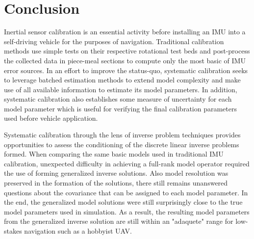 
\begingroup
\allowdisplaybreaks

\section{Conclusion}

Inertial sensor calibration is an essential activity before installing an IMU into a self-driving vehicle for the purposes of navigation. Traditional calibration methods use simple tests on their respective rotational test beds and post-process the collected data in piece-meal sections to compute only the most basic of IMU error sources. In an effort to improve the status-quo, systematic calibration seeks to leverage batched estimation methods to extend model complexity and make use of all available information to estimate its model parameters. In addition, systematic calibration also establishes some measure of uncertainty for each model parameter which is useful for verifying the final calibration parameters used before vehicle application. 

Systematic calibration through the lens of inverse problem techniques provides opportunities to assess the conditioning of the discrete linear inverse problems formed. When comparing the same basic models used in traditional IMU calibration, unexpected difficulty in achieving a full-rank model operator required the use of forming generalized inverse solutions. Also model resolution was preserved in the formation of the solutions, there still remains unanswered questions about the covariance that can be assigned to each model parameter. In the end, the generalized model solutions were still surprisingly close to the true model parameters used in simulation. As a result, the resulting model parameters from the generalized inverse solution are still within an "adaquete" range for low-stakes navigation such as a hobbyist UAV. 